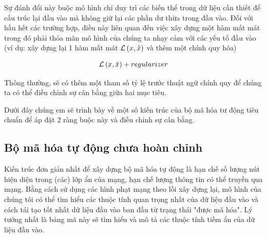 \newpage
Sự đánh đổi này buộc mô hình chỉ duy trì các biến thể trong dữ liệu cần
thiết để cấu trúc lại đầu vào mà không giữ lại các phần dư thừa trong đầu vào.
Đối với hầu hết các trường hợp, điều này liên quan đến việc xây dựng một hàm mất mát
trong đó phải thỏa mãn mô hình của chúng ta nhạy cảm với các yếu tố đầu vào
(ví dụ: xây dựng lại 1 hàm mất mát ${\cal L}\left( {x,\hat x} \right)$ và
thêm một chính quy hóa)


\begin{equation}
    {\cal L}\left( {x,\hat x} \right) + regularizer
\end{equation}

Thông thường, sẽ có thêm một tham số tỷ lệ trước thuật ngữ chính quy để chúng ta
có thể điều chỉnh sự cân bằng giữa hai mục tiêu.

Dưới đây chúng em sẽ trình bày về một số kiến trúc của bộ mã hóa tư động
tiêu chuẩn để áp đặt 2 ràng buộc này và điều chỉnh sự cân bằng.



\subsection{Bộ mã hóa tự động chưa hoàn chỉnh}

Kiến trúc đơn giản nhất để xây dựng bộ mã hóa tự động là hạn chế số lượng
nút hiện diện trong (các) lớp ẩn của mạng, hạn chế lượng thông tin có
thể truyền qua mạng. Bằng cách sử dụng các hình phạt mạng theo lỗi xây dựng lại,
mô hình của chúng tôi có thể tìm hiểu các thuộc tính quan trọng nhất của dữ
liệu đầu vào và cách tái tạo tốt nhất dữ liệu đầu vào ban đầu từ trạng thái
"được mã hóa". Lý tưởng nhất là bảng mã này sẽ tìm hiểu và mô tả các thuộc
tính tiềm ẩn của dữ liệu đầu vào.


